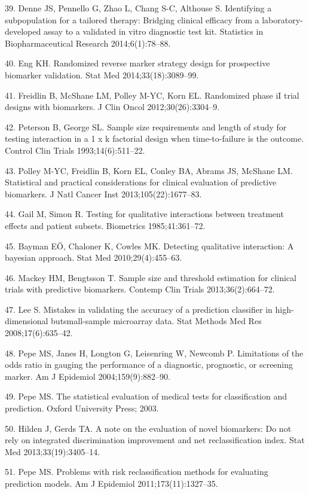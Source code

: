 \documentclass[11pt]{article}
\begin{document}
39. Denne JS, Pennello G, Zhao L, Chang S-C, Althouse S. Identifying a
subpopulation for a tailored therapy: Bridging clinical efficacy from a
laboratory-developed assay to a validated in vitro diagnostic test kit.
Statistics in Biopharmaceutical Research 2014;6(1):78--88.

40. Eng KH. Randomized reverse marker strategy design for prospective
biomarker validation. Stat Med 2014;33(18):3089--99.

41. Freidlin B, McShane LM, Polley M-YC, Korn EL. Randomized phase iI
trial designs with biomarkers. J Clin Oncol 2012;30(26):3304--9.

42. Peterson B, George SL. Sample size requirements and length of study
for testing interaction in a 1 x k factorial design when time-to-failure
is the outcome. Control Clin Trials 1993;14(6):511--22.

43. Polley M-YC, Freidlin B, Korn EL, Conley BA, Abrams JS, McShane LM.
Statistical and practical considerations for clinical evaluation of
predictive biomarkers. J Natl Cancer Inst 2013;105(22):1677--83.

44. Gail M, Simon R. Testing for qualitative interactions between
treatment effects and patient subsets. Biometrics 1985;41:361--72.

45. Bayman EÖ, Chaloner K, Cowles MK. Detecting qualitative interaction:
A bayesian approach. Stat Med 2010;29(4):455--63.

46. Mackey HM, Bengtsson T. Sample size and threshold estimation for
clinical trials with predictive biomarkers. Contemp Clin Trials
2013;36(2):664--72.

47. Lee S. Mistakes in validating the accuracy of a prediction
classifier in high-dimensional butsmall-sample microarray data. Stat
Methods Med Res 2008;17(6):635--42.

48. Pepe MS, Janes H, Longton G, Leisenring W, Newcomb P. Limitations of
the odds ratio in gauging the performance of a diagnostic, prognostic,
or screening marker. Am J Epidemiol 2004;159(9):882--90.

49. Pepe MS. The statistical evaluation of medical tests for
classification and prediction. Oxford University Press; 2003.

50. Hilden J, Gerds TA. A note on the evaluation of novel biomarkers: Do
not rely on integrated discrimination improvement and net
reclassification index. Stat Med 2013;33(19):3405--14.

51. Pepe MS. Problems with risk reclassification methods for evaluating
prediction models. Am J Epidemiol 2011;173(11):1327--35.
\end{document}
